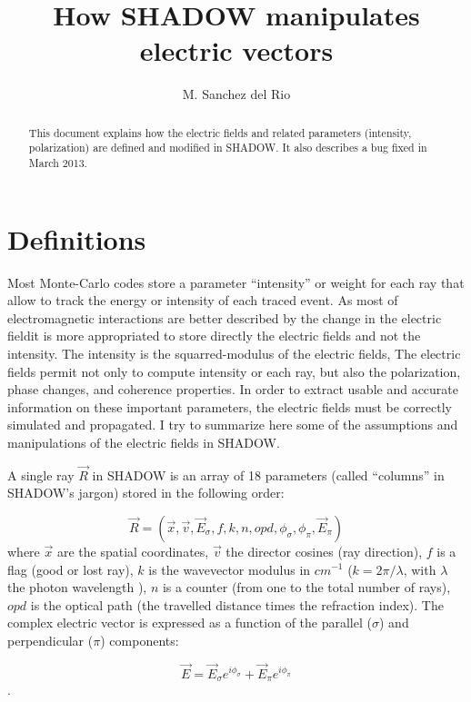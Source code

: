 \documentclass[a4paper,10pt]{article}
\title{How SHADOW manipulates electric vectors}
\author{M. Sanchez del Rio}
\begin{document}
\maketitle

\begin{abstract}
This document explains how the electric fields and related parameters (intensity, polarization) are
defined and modified in SHADOW. It also describes a bug fixed in March 2013. 
\end{abstract}

\section{Definitions} 

Most Monte-Carlo codes store a parameter ``intensity'' or weight for each ray that allow to track the energy or 
intensity of each traced event. As most of electromagnetic interactions are better described by the change in
the electric fieldit is more appropriated
to store directly the electric fields and not the intensity. The intensity is the squarred-modulus of 
the electric fields, The electric fields permit not only to compute
intensity or each ray, but also the polarization, phase changes, and coherence properties. In order to extract
usable and accurate information on these important parameters, the electric fields must be correctly simulated and
propagated. I try to summarize here some of the assumptions and manipulations of the electric fields in SHADOW. 

A single ray $\vec{R}$ in SHADOW is an array of 18 parameters (called ``columns'' in SHADOW's jargon) stored
in the following order:

\begin{equation}
   \vec{R}=( \vec{x},\vec{v},\vec{E}_\sigma,f,k,n,opd,\phi_\sigma,\phi_\pi,\vec{E}_\pi)
\end{equation}
where $\vec{x}$ are the spatial coordinates, $\vec{v}$ the director cosines (ray direction), $f$ is a flag (good or
lost ray), $k$ is the wavevector modulus in $cm^{-1}$ ($k=2\pi / \lambda$, with $\lambda$ the photon wavelength ),
$n$ is a counter (from one to the total number of rays), $opd$ is the optical path (the travelled
distance times the refraction index). The complex electric vector is expressed as a function of the parallel
($\sigma$) and perpendicular ($\pi$) components:

\begin{equation}
   \vec{E}= \vec{E}_\sigma e^{i \phi_\sigma} + \vec{E}_\pi e^{i \phi_\pi}
\end{equation}.
\end{document}
